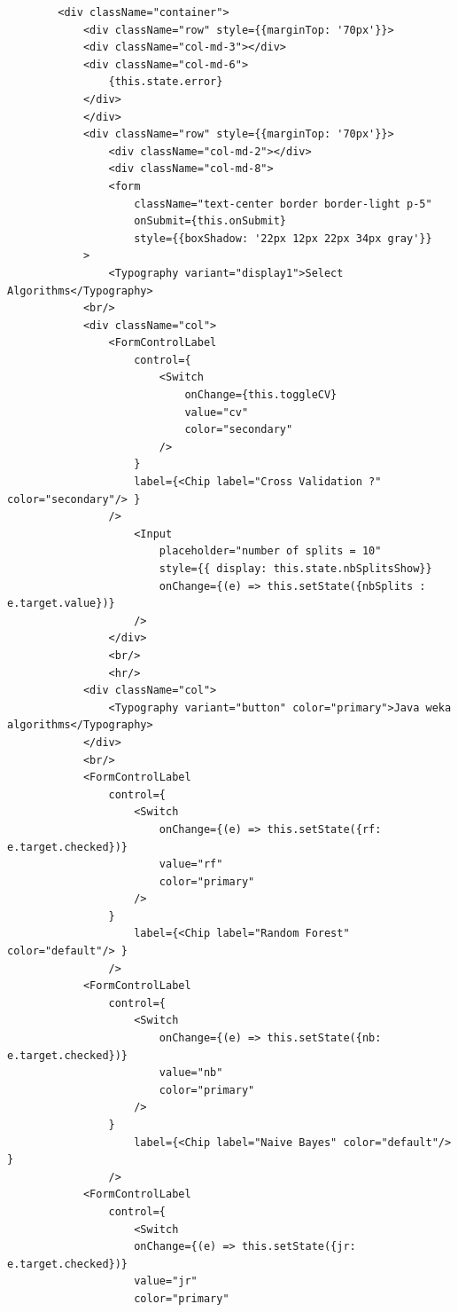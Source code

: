 \documentclass[a4paper,11pt]{article}
\begin{document}
\begin{itemize}
\begin{itemize}
\begin{verbatim}
        <div className="container">
            <div className="row" style={{marginTop: '70px'}}>
            <div className="col-md-3"></div>
            <div className="col-md-6">
                {this.state.error}
            </div>
            </div>
            <div className="row" style={{marginTop: '70px'}}>
                <div className="col-md-2"></div>
                <div className="col-md-8">
                <form
                    className="text-center border border-light p-5"
                    onSubmit={this.onSubmit}
                    style={{boxShadow: '22px 12px 22px 34px gray'}}
            >
                <Typography variant="display1">Select Algorithms</Typography>
            <br/>
            <div className="col">
                <FormControlLabel
                    control={
                        <Switch
                            onChange={this.toggleCV}
                            value="cv"
                            color="secondary"
                        />
                    }
                    label={<Chip label="Cross Validation ?" color="secondary"/> }
                />
                    <Input
                        placeholder="number of splits = 10"
                        style={{ display: this.state.nbSplitsShow}}
                        onChange={(e) => this.setState({nbSplits : e.target.value})}
                    />
                </div>
                <br/>
                <hr/>
            <div className="col">
                <Typography variant="button" color="primary">Java weka algorithms</Typography>
            </div>
            <br/>
            <FormControlLabel
                control={
                    <Switch
                        onChange={(e) => this.setState({rf: e.target.checked})}
                        value="rf"
                        color="primary"
                    />
                }
                    label={<Chip label="Random Forest" color="default"/> }
                />
            <FormControlLabel
                control={
                    <Switch
                        onChange={(e) => this.setState({nb: e.target.checked})}
                        value="nb"
                        color="primary"
                    />
                }
                    label={<Chip label="Naive Bayes" color="default"/> }
                />
            <FormControlLabel
                control={
                    <Switch
                    onChange={(e) => this.setState({jr: e.target.checked})}
                    value="jr"
                    color="primary"

\end{verbatim}
\end{itemize}
\end{itemize}
\end{document}
